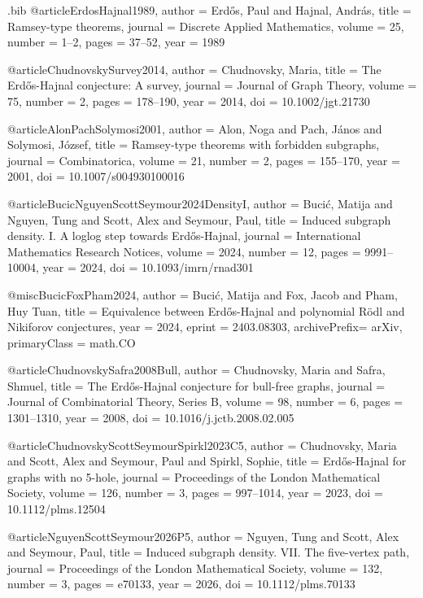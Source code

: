 \begin{filecontents*}{\jobname.bib}
@article{ErdosHajnal1989,
  author  = {Erd\H{o}s, Paul and Hajnal, Andr\'as},
  title   = {Ramsey-type theorems},
  journal = {Discrete Applied Mathematics},
  volume  = {25},
  number  = {1--2},
  pages   = {37--52},
  year    = {1989}
}

@article{ChudnovskySurvey2014,
  author  = {Chudnovsky, Maria},
  title   = {The {Erd\H{o}s-Hajnal} conjecture: A survey},
  journal = {Journal of Graph Theory},
  volume  = {75},
  number  = {2},
  pages   = {178--190},
  year    = {2014},
  doi     = {10.1002/jgt.21730}
}

@article{AlonPachSolymosi2001,
  author  = {Alon, Noga and Pach, J\'anos and Solymosi, J\'ozsef},
  title   = {Ramsey-type theorems with forbidden subgraphs},
  journal = {Combinatorica},
  volume  = {21},
  number  = {2},
  pages   = {155--170},
  year    = {2001},
  doi     = {10.1007/s004930100016}
}

@article{BucicNguyenScottSeymour2024DensityI,
  author  = {Buci\'c, Matija and Nguyen, Tung and Scott, Alex and Seymour, Paul},
  title   = {Induced subgraph density. {I}. A loglog step towards {Erd\H{o}s-Hajnal}},
  journal = {International Mathematics Research Notices},
  volume  = {2024},
  number  = {12},
  pages   = {9991--10004},
  year    = {2024},
  doi     = {10.1093/imrn/rnad301}
}

@misc{BucicFoxPham2024,
  author       = {Buci\'c, Matija and Fox, Jacob and Pham, Huy Tuan},
  title        = {Equivalence between {Erd\H{o}s-Hajnal} and polynomial {R\"odl} and {Nikiforov} conjectures},
  year         = {2024},
  eprint       = {2403.08303},
  archivePrefix= {arXiv},
  primaryClass = {math.CO}
}

@article{ChudnovskySafra2008Bull,
  author  = {Chudnovsky, Maria and Safra, Shmuel},
  title   = {The {Erd\H{o}s-Hajnal} conjecture for bull-free graphs},
  journal = {Journal of Combinatorial Theory, Series B},
  volume  = {98},
  number  = {6},
  pages   = {1301--1310},
  year    = {2008},
  doi     = {10.1016/j.jctb.2008.02.005}
}

@article{ChudnovskyScottSeymourSpirkl2023C5,
  author  = {Chudnovsky, Maria and Scott, Alex and Seymour, Paul and Spirkl, Sophie},
  title   = {{Erd\H{o}s-Hajnal} for graphs with no 5-hole},
  journal = {Proceedings of the London Mathematical Society},
  volume  = {126},
  number  = {3},
  pages   = {997--1014},
  year    = {2023},
  doi     = {10.1112/plms.12504}
}

@article{NguyenScottSeymour2026P5,
  author  = {Nguyen, Tung and Scott, Alex and Seymour, Paul},
  title   = {Induced subgraph density. {VII}. The five-vertex path},
  journal = {Proceedings of the London Mathematical Society},
  volume  = {132},
  number  = {3},
  pages   = {e70133},
  year    = {2026},
  doi     = {10.1112/plms.70133}
}


\end{filecontents*}
